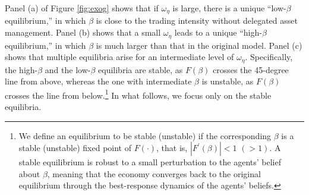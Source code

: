 Panel (a) of Figure \ref{fig:exog} shows that if $\omega_{\eta}$ is large, there is a unique ``low-$\beta$ equilibrium,'' in which  $\beta$ is close to the trading intensity without delegated asset management. Panel (b) shows that a small $\omega_{\eta}$ leads to a unique ``high-$\beta$ equilibrium,'' in which $\beta$ is much larger than that in the original \citet{kyle1985continuous} model.
Panel (c) shows that multiple equilibria arise for an intermediate level of $\omega_{\eta}$. Specifically, the high-$\beta$ and the low-$\beta$ equilibria are stable, as $F(\beta)$ crosses the 45-degree line from above, whereas the one with intermediate $\beta$ is unstable, as $F(\beta)$ crosses the line from below.\footnote{We define an equilibrium to be stable (unstable) if the corresponding $\beta$ is a stable (unstable) fixed point of $F(\cdot)$, that is, $|F^{\prime}(\beta)|<1$ $(>1)$. A stable equilibrium is robust to a small perturbation to the agents' belief about $\beta$, meaning that the economy converges back to the original equilibrium through the best-response dynamics of the agents' beliefs.}  In what follows, we focus only on the stable equilibria. 



